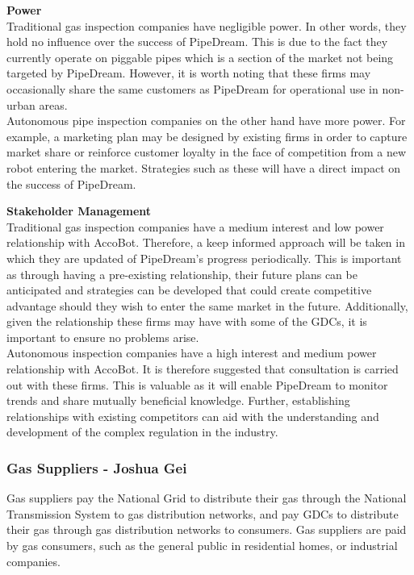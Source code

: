 \documentclass[11pt]{article}		%
\begin{document}
            \textbf{Power}
            \\
            Traditional gas inspection companies have negligible power. In other words, they hold no influence over the success of PipeDream. This is due to the fact they currently operate on piggable pipes which is a section of the market not being targeted by PipeDream. However, it is worth noting that these firms may occasionally share the same customers as PipeDream for operational use in non-urban areas.
            \\
            \hspace*{2ex}Autonomous pipe inspection companies on the other hand have more power. For example, a marketing plan may be designed by existing firms in order to capture market share or reinforce customer loyalty in the face of competition from a new robot entering the market. Strategies such as these will have a direct impact on the success of PipeDream. 
            
            \textbf{Stakeholder Management}
            \\
            Traditional gas inspection companies have a medium interest and low power relationship with AccoBot. Therefore, a keep informed approach will be taken in which they are updated of PipeDream's progress periodically. This is important as through having a pre-existing relationship, their future plans can be anticipated and  strategies can be developed that could create competitive advantage should they wish to enter the same market in the future. Additionally, given the relationship these firms may have with some of the GDCs, it is important to ensure no problems arise.
            \\
            \hspace*{2ex}Autonomous inspection companies have a high interest and medium power relationship with AccoBot. It is therefore suggested that consultation is carried out with these firms. This is valuable as it will enable PipeDream to monitor trends and share mutually beneficial knowledge.  Further, establishing relationships with existing competitors can aid with the understanding and development of the complex regulation in the industry.

		\subsubsection[Gas Suppliers]{Gas Suppliers - Joshua Gei}
		
		Gas suppliers pay the National Grid to distribute their gas through the National Transmission System to gas distribution networks, and pay GDCs to distribute their gas through gas distribution networks to consumers. Gas suppliers are paid by gas consumers, such as the general public in residential homes, or industrial companies.   
		
\end{document}
